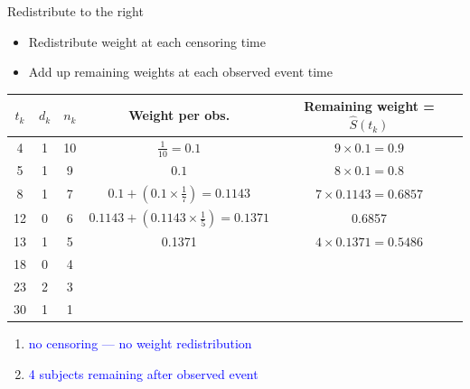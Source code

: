\documentclass[10pt,t]{beamer}
\begin{document}
\begin{frame}{Redistribute to the right}
	
	\vspace{-5 mm}
	
	\begin{itemize}
		\item Redistribute weight at each censoring time
		
		\medskip
		
		\item Add up remaining weights at each observed event time
	\end{itemize}

\smallskip

	\begin{footnotesize}
		\begin{center}
		\begin{tabular}{|c|c|c|c|c|}
			\hline
			$t_k$ & $d_k$ & $n_k$ & Weight per obs. & Remaining weight = $\widehat{S}(t_k)$ \\
			\hline
			4 & 1 & 10 & $\frac{1}{10} = 0.1$ & $9\times 0.1= 0.9$\\
			5 & 1 & 9 & $0.1$ &  $8\times 0.1= 0.8$  \\
			8 & 1 & 7 & $0.1 + (0.1\times \frac{1}{7}) = 0.1143$ & $7 \times 0.1143 = 0.6857$\\
			12 & 0 & 6 & $0.1143 +  (0.1143\times\frac{1}{5}) = 0.1371$ &  0.6857\\
			13 & 1 & 5 & 0.1371 & $4 \times 0.1371 =0.5486 $\\
			18 & 0 & 4 & & \\
			23 & 2 & 3 & & \\
			30 & 1 & 1 & & \\
			\hline
		\end{tabular}
	\end{center}
	\end{footnotesize}
\medskip

	\begin{enumerate}
		\item \textcolor{blue}{no censoring --- no weight redistribution}
		
		\medskip
		
		\item \textcolor{blue}{4 subjects remaining after observed event}
	\end{enumerate}
\end{frame}
\end{document}
